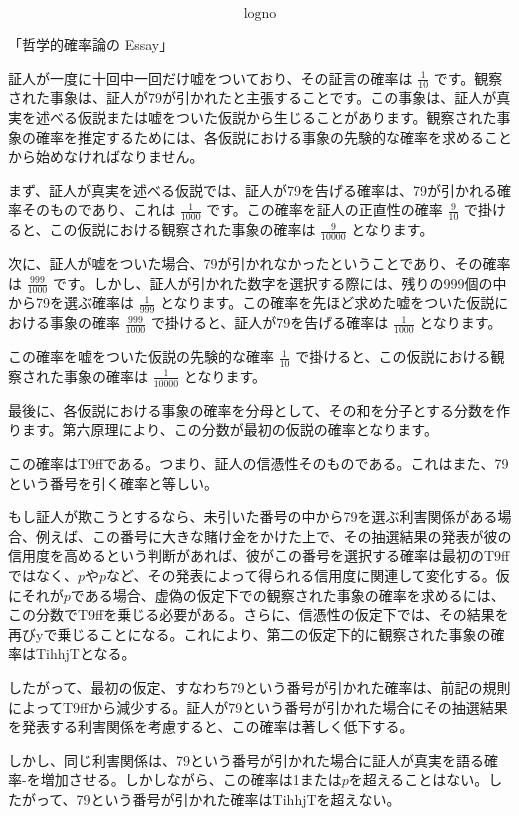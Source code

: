 \documentclass[a4paper,11pt,openany]{ltjsbook}
\begin{document}
$$
\log \text{no}
$$

「哲学的確率論の Essay」

証人が一度に十回中一回だけ嘘をついており、その証言の確率は \( \frac{1}{10} \) です。観察された事象は、証人が79が引かれたと主張することです。この事象は、証人が真実を述べる仮説または嘘をついた仮説から生じることがあります。観察された事象の確率を推定するためには、各仮説における事象の先験的な確率を求めることから始めなければなりません。

まず、証人が真実を述べる仮説では、証人が79を告げる確率は、79が引かれる確率そのものであり、これは \( \frac{1}{1000} \) です。この確率を証人の正直性の確率 \( \frac{9}{10} \) で掛けると、この仮説における観察された事象の確率は \( \frac{9}{10000} \) となります。

次に、証人が嘘をついた場合、79が引かれなかったということであり、その確率は \( \frac{999}{1000} \) です。しかし、証人が引かれた数字を選択する際には、残りの999個の中から79を選ぶ確率は \( \frac{1}{999} \) となります。この確率を先ほど求めた嘘をついた仮説における事象の確率 \( \frac{999}{1000} \) で掛けると、証人が79を告げる確率は \( \frac{1}{1000} \) となります。

この確率を嘘をついた仮説の先験的な確率 \( \frac{1}{10} \) で掛けると、この仮説における観察された事象の確率は \( \frac{1}{10000} \) となります。

最後に、各仮説における事象の確率を分母として、その和を分子とする分数を作ります。第六原理により、この分数が最初の仮説の確率となります。

この確率はT9ffである。つまり、証人の信憑性そのものである。これはまた、79という番号を引く確率と等しい。

もし証人が欺こうとするなら、未引いた番号の中から79を選ぶ利害関係がある場合、例えば、この番号に大きな賭け金をかけた上で、その抽選結果の発表が彼の信用度を高めるという判断があれば、彼がこの番号を選択する確率は最初のT9ffではなく、$p$や$p$など、その発表によって得られる信用度に関連して変化する。仮にそれが$p$である場合、虚偽の仮定下での観察された事象の確率を求めるには、この分数でT9ffを乗じる必要がある。さらに、信憑性の仮定下では、その結果を再びyで乗じることになる。これにより、第二の仮定下的に観察された事象の確率はTihhjTとなる。

したがって、最初の仮定、すなわち79という番号が引かれた確率は、前記の規則によってT9ffから減少する。証人が79という番号が引かれた場合にその抽選結果を発表する利害関係を考慮すると、この確率は著しく低下する。

しかし、同じ利害関係は、79という番号が引かれた場合に証人が真実を語る確率-を増加させる。しかしながら、この確率は1または$p$を超えることはない。したがって、79という番号が引かれた確率はTihhjTを超えない。
\end{document}
